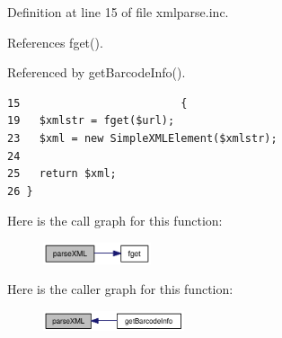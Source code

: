 Definition at line 15 of file xmlparse.inc.

References fget().

Referenced by getBarcodeInfo().

\begin{Code}\begin{verbatim}15                         {
19   $xmlstr = fget($url);
23   $xml = new SimpleXMLElement($xmlstr);
24 
25   return $xml;
26 }\end{verbatim}
\end{Code}




Here is the call graph for this function:\nopagebreak
\begin{figure}[H]
\begin{center}
\leavevmode
\includegraphics[width=90pt]{xmlparse_8inc_2ee17c038e8fe8a1ddc86bb533863cb7_cgraph}
\end{center}
\end{figure}


Here is the caller graph for this function:\nopagebreak
\begin{figure}[H]
\begin{center}
\leavevmode
\includegraphics[width=118pt]{xmlparse_8inc_2ee17c038e8fe8a1ddc86bb533863cb7_icgraph}
\end{center}
\end{figure}
